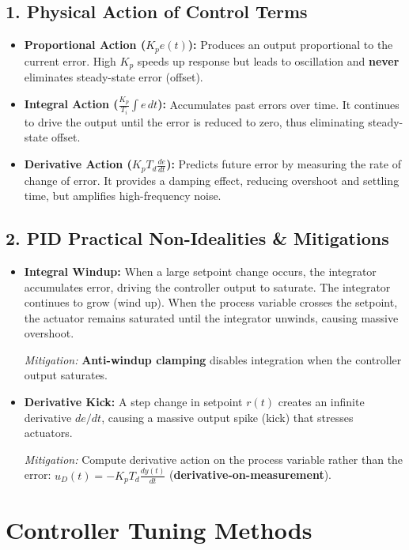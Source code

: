 \documentclass[12pt,a4paper]{article}
\begin{document}
\subsection{1. Physical Action of Control Terms}
\begin{itemize}[leftmargin=*, itemsep=2.5pt]
  \item \textbf{Proportional Action ($K_p e(t)$):} Produces an output proportional to the current error. High $K_p$ speeds up response but leads to oscillation and \textbf{never} eliminates steady-state error (offset).
  \item \textbf{Integral Action ($\frac{K_p}{T_i} \int e\,dt$):} Accumulates past errors over time. It continues to drive the output until the error is reduced to zero, thus eliminating steady-state offset.
  \item \textbf{Derivative Action ($K_p T_d \frac{de}{dt}$):} Predicts future error by measuring the rate of change of error. It provides a damping effect, reducing overshoot and settling time, but amplifies high-frequency noise.
\end{itemize}

\subsection{2. PID Practical Non-Idealities \& Mitigations}
\begin{itemize}[leftmargin=*, itemsep=2.5pt]
  \item \textbf{Integral Windup:} When a large setpoint change occurs, the integrator accumulates error, driving the controller output to saturate. The integrator continues to grow (wind up). When the process variable crosses the setpoint, the actuator remains saturated until the integrator unwinds, causing massive overshoot.
  
  \textit{Mitigation:} \textbf{Anti-windup clamping} disables integration when the controller output saturates.
  \item \textbf{Derivative Kick:} A step change in setpoint $r(t)$ creates an infinite derivative $de/dt$, causing a massive output spike (kick) that stresses actuators.
  
  \textit{Mitigation:} Compute derivative action on the process variable rather than the error: $u_D(t) = -K_p T_d \frac{dy(t)}{dt}$ (\textbf{derivative-on-measurement}).
\end{itemize}

\section{Controller Tuning Methods}
\end{document}
